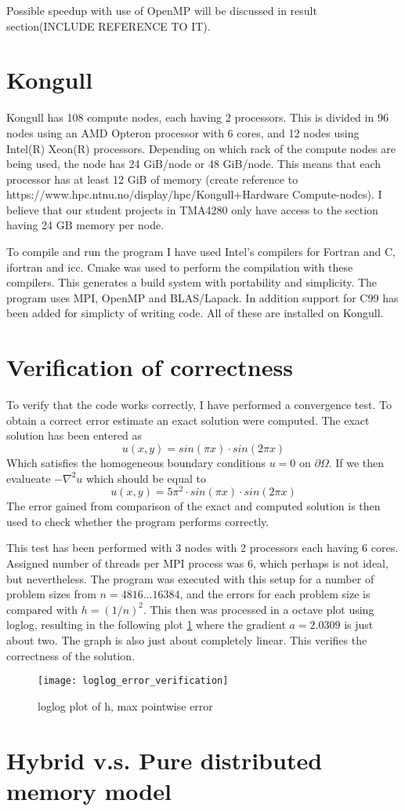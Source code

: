 Possible speedup with use of OpenMP will be discussed in result section(INCLUDE REFERENCE TO IT). 



\section{Kongull}
Kongull has 108 compute nodes, each having 2 processors. This is divided in 96 nodes using an AMD Opteron processor with 6 cores, and 12 nodes using Intel(R) Xeon(R) processors. Depending on which rack of the compute nodes are being used, the node has 24 GiB/node or 48 GiB/node. This means that each processor has at least 12 GiB of memory (create reference to https://www.hpc.ntnu.no/display/hpc/Kongull+Hardware Compute-nodes). I believe that our student projects in TMA4280 only have access to the section having 24 GB memory per node. 

To compile and run the program I have used Intel's compilers for Fortran and C, ifortran and icc. Cmake was used to perform the compilation with these compilers. This generates a build system with portability and simplicity. 
The program uses MPI, OpenMP and BLAS/Lapack. In addition support for C99 has been added for simplicty of writing code.
All of these are installed on Kongull.


\section{Verification of correctness}
To verify that the code works correctly, I have performed a convergence test. To obtain a correct error estimate an exact solution were computed. The exact solution has been entered as 
\begin{equation}
	u(x,y) = sin(\pi x) \cdot sin(2\pi x)
\end{equation}
Which satisfies the homogeneous boundary conditions $u = 0 \text{ on } \partial\Omega$. If we then evalueate $-\nabla^2 u$ which should be equal to 
\begin{equation}
	u(x,y) = 5\pi^2 \cdot sin(\pi x) \cdot sin(2\pi x)
\end{equation}
The error gained from comparison of the exact and computed solution is then used to check whether the program performs correctly.

This test has been performed with 3 nodes with 2 processors each having 6 cores. Assigned number of threads per MPI process was 6, which perhaps is not ideal, but nevertheless. The program was executed with this setup for a number of problem sizes from $n=4 8 16 ...16384$, and the errors for each problem size is compared with $h=(1 / n)^2$. This then was processed in a octave plot using loglog, resulting in the following plot \ref{fig:loglogerror} where the gradient $a = 2.0309$ is just about two. The graph is also just about completely linear. This verifies the correctness of the solution. 
\begin{figure}[htbp]
	\centering
	\texttt{[image: loglog\_error\_verification]}
	\caption{loglog plot of h, max pointwise error}
	\label{fig:loglogerror}
\end{figure}

\section{Hybrid v.s. Pure distributed memory model}

